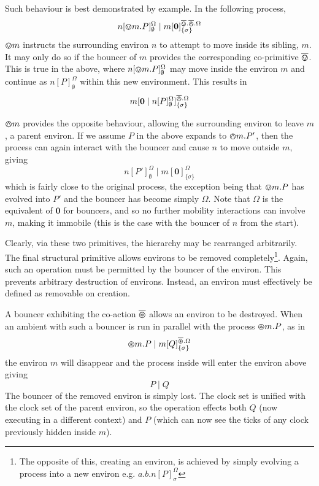 \documentclass{sig-alternate}
\newcommand{\nil}{\textbf{0}}
\newcommand{\loc}[4]{{#1}[ #2 ]^{#3}_{\{#4\}}}
\newcommand{\locv}[4]{{#1}[ #2 ]^{#3}_{#4}}
\newcommand{\bin}{\overline{\varovee}}
\newcommand{\bout}{\overline{\varowedge}}
\newcommand{\bopen}{\overline{\varoast}}
\newcommand{\tntin}[1]{\tin #1}
\newcommand{\tntout}[1]{\tout #1}
\newcommand{\tntopen}[1]{\topen #1}
\newcommand{\tin}{\varovee}
\newcommand{\tout}{\varowedge}
\newcommand{\topen}{\varoast}
\begin{document}
Such behaviour is best demonstrated by example.  In the following
 process,
\begin{displaymath}
\locv{n}{\tntin{m}.P}{\Omega}{\emptyset} \mid \loc{m}{\nil}{\bin.\bout.\Omega}{\sigma}
\end{displaymath}
$\tntin{m}$ instructs the surrounding environ $n$ to attempt to move
inside its sibling, $m$. It may only do so if the bouncer of $m$
provides the corresponding co-primitive $\bin$.  This is true in the
above, where $\locv{n}{\tntin{m}.P}{\Omega}{\emptyset}$ may move inside
the environ $m$ and continue as $\locv{n}{P}{\Omega}{\emptyset}$ within
this new environment.  This results in
\begin{displaymath}
\loc{m}{\nil \mid \locv{n}{P}{\Omega}{\emptyset}}{\bout.\Omega}{\sigma}
\end{displaymath}

$\tntout{m}$ provides the opposite behaviour, allowing the surrounding
environ to leave $m$, a parent environ.  If we assume $P$ in the above
expands to $\tntout{m}.P'$, then the process can again interact with the
bouncer and cause $n$ to move outside $m$, giving
\begin{displaymath}
\locv{n}{P'}{\Omega}{\emptyset} \mid \loc{m}{\nil}{\Omega}{\sigma}
\end{displaymath}
which is fairly close to the original process, the exception being that
$\tntin{m}.P$ has evolved into $P'$ and the bouncer has become simply
$\Omega$.  Note that $\Omega$ is the equivalent of $\nil$ for bouncers,
and so no further mobility interactions can involve $m$, making it
immobile (this is the case with the bouncer of $n$ from the start).

Clearly, via these two primitives, the hierarchy may be rearranged
arbitrarily.  The final structural primitive allows environs to be
removed completely\footnote{The opposite of this, creating an environ,
is achieved by simply evolving a process into a new environ
e.g. $a.b.\locv{n}{P}{\Omega}{\sigma}$}.  Again, such an operation must
be permitted by the bouncer of the environ.  This prevents arbitrary
destruction of environs.  Instead, an environ must effectively be
defined as removable on creation.

A bouncer exhibiting the co-action $\bopen$ allows an environ to be
destroyed.  When an ambient with such a bouncer is run in parallel with
the process $\tntopen{m}.P$, as in
\begin{displaymath}
\tntopen{m}.P \mid \loc{m}{Q}{\bopen.\Omega}{\sigma}
\end{displaymath}
the environ $m$ will disappear and the process inside will enter the
environ above giving
\begin{displaymath}
P \mid Q
\end{displaymath}
The bouncer of the removed environ is simply lost.  The clock set is
unified with the clock set of the parent environ, so the operation
effects both $Q$ (now executing in a different context) and $P$ (which
can now see the ticks of any clock previously hidden inside $m$).
\end{document}
